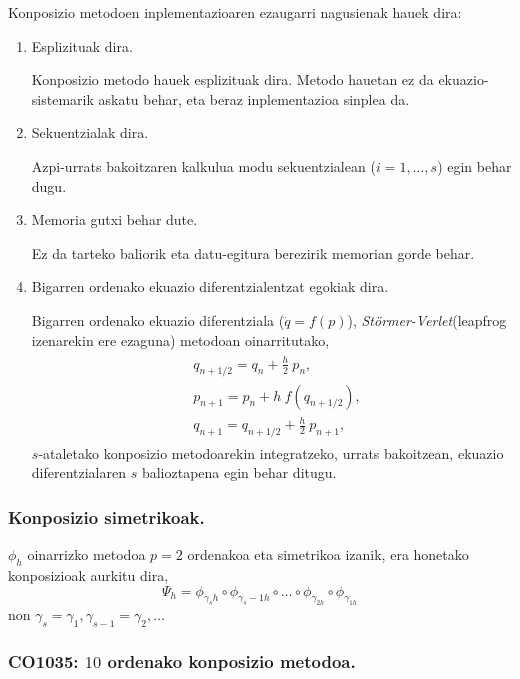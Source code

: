 Konposizio metodoen inplementazioaren ezaugarri nagusienak hauek dira:
\begin{enumerate}
\item{Esplizituak dira.}

Konposizio metodo hauek esplizituak dira. Metodo hauetan ez da ekuazio-sistemarik askatu behar, eta beraz inplementazioa sinplea da. 

\item{Sekuentzialak dira.}

Azpi-urrats bakoitzaren kalkulua modu sekuentzialean ($i=1,\dots,s$) egin behar dugu.

\item{Memoria gutxi behar dute.}

Ez da tarteko baliorik eta datu-egitura berezirik memorian gorde behar.   

\item{Bigarren ordenako ekuazio diferentzialentzat egokiak dira.}

Bigarren ordenako ekuazio diferentziala ($\ddot{q}=f(p)$), \emph{Störmer-Verlet}(leapfrog izenarekin ere ezaguna) metodoan oinarritutako, 
\begin{align}
\begin{split}
&q_{{n+1}/{2}}=q_n+\frac{h}{2} \ p_n,\\
&p_{n+1}=p_n+h \ f(q_{{n+1}/{2}}),\\
&q_{n+1}=q_{{n+1}/{2}}+\frac{h}{2} \ p_{n+1},
\end{split}
\label{eq:stverlet}
\end{align}
$s$-ataletako konposizio metodoarekin integratzeko, urrats bakoitzean, ekuazio diferentzialaren $s$ balioztapena egin behar ditugu.

\end{enumerate}

\subsubsection*{Konposizio simetrikoak.}

$\phi_h$ oinarrizko metodoa $p=2$ ordenakoa eta simetrikoa izanik, era honetako konposizioak aurkitu dira,
\begin{equation}
\Psi_h=\phi_{\gamma_s h} \circ \phi_{\gamma_s-1 h} \circ \dots \circ \phi_{\gamma_{2 h}} \circ \phi_{\gamma_{1 h}} 
\end{equation}
non $\gamma_s=\gamma_1, \gamma_{s-1}=\gamma_2,\dots$ 

\subsubsection*{CO1035: $10$ ordenako konposizio metodoa.}

